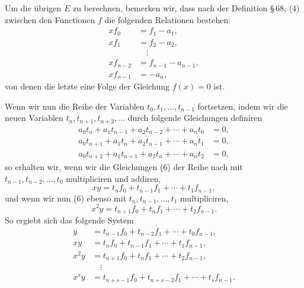 \documentclass[11pt]{article}
\begin{document}
Um die übrigen $E$ zu berechnen, bemerken wir, dass nach der Definition \S\,68, (4) zwischen den Functionen $f$ die folgenden Relationen bestehen:
\begin{equation}
\begin{aligned}
 xf_0&=f_1-a_1,\\
 xf_1&=f_2-a_2,\\
 &\quad\vdots\\
 xf_{n-2}&=f_{n-1}-a_{n-1},\\
 xf_{n-1}&=-a_n,
\end{aligned}
\tag{6}
\end{equation}
von denen die letzte eine Folge der Gleichung $f(x)=0$ ist.

Wenn wir nun die Reihe der Variablen $t_0,t_1,\ldots,t_{n-1}$ fortsetzen, indem wir die neuen Variablen $t_n,t_{n+1},t_{n+2},\ldots$ durch folgende Gleichungen definiren
\begin{equation}
\begin{aligned}
 a_0t_n+a_1t_{n-1}+a_2t_{n-2}+\cdots+a_nt_0&=0,\\
 a_0t_{n+1}+a_1t_n+a_2t_{n-1}+\cdots+a_nt_1&=0,\\
 a_0t_{n+2}+a_1t_{n+1}+a_2t_n+\cdots+a_nt_2&=0,
\end{aligned}
\tag{7}
\end{equation}
so erhalten wir, wenn wir die Gleichungen (6) der Reihe nach mit $t_{n-1},t_{n-2},\ldots,t_0$ multipliciren und addiren,
\[
 xy=t_nf_0+t_{n-1}f_1+\cdots+t_1f_{n-1},
\]
und wenn wir nun (6) ebenso mit $t_n,t_{n-1},\ldots,t_1$ multipliciren,
\[
 x^2y=t_{n+1}f_0+t_nf_1+\cdots+t_2f_{n-1}.
\]
So ergiebt sich das folgende System
\begin{equation}
\begin{aligned}
 y&=t_{n-1}f_0+t_{n-2}f_1+\cdots+t_0f_{n-1},\\
 xy&=t_nf_0+t_{n-1}f_1+\cdots+t_1f_{n-1},\\
 x^2y&=t_{n+1}f_0+t_nf_1+\cdots+t_2f_{n-1},\\
 &\quad\vdots\\
 x^sy&=t_{n+s-1}f_0+t_{n+s-2}f_1+\cdots+t_sf_{n-1}.
\end{aligned}
\tag{8}
\end{equation}
\end{document}

